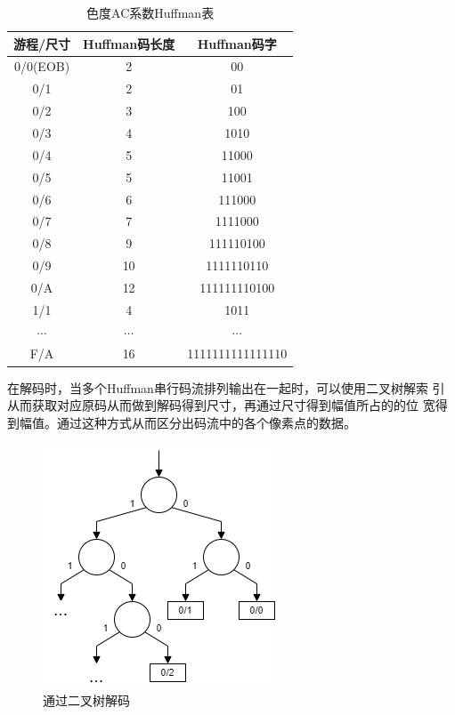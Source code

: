 \documentclass{article}
\numberwithin {equation}{section}
\begin{document}
\begin{spacing}{1.25}
      \begin{table}[H]
        \centering
        \caption{色度AC系数Huffman表}
        \begin{tabular}{ccc}
          \toprule
          游程/尺寸 & Huffman码长度 & Huffman码字\\
          \midrule
          0/0(EOB)  & 2             & 00\\
          0/1       & 2             & 01\\
          0/2       & 3             & 100\\
          0/3       & 4             & 1010\\
          0/4       & 5             & 11000\\
          0/5       & 5             & 11001\\
          0/6       & 6             & 111000\\
          0/7       & 7             & 1111000\\
          0/8       & 9             & 111110100\\
          0/9       & 10            & 1111110110\\
          0/A       & 12            & 111111110100\\
          1/1       & 4             & 1011\\
          $\cdots$  & $\cdots$      & $\cdots$\\
          F/A       & 16            & 1111111111111110\\
          \bottomrule
        \end{tabular}
      \end{table}

      在解码时，当多个Huffman串行码流排列输出在一起时，可以使用二叉树解索
      引从而获取对应原码从而做到解码得到尺寸，再通过尺寸得到幅值所占的的位
      宽得到幅值。通过这种方式从而区分出码流中的各个像素点的数据。
      \begin{figure}[H]
        \centering
        \includegraphics[scale=0.8]{./pictures/deCodeTree.png}
        \caption{通过二叉树解码}
      \end{figure}

\end{spacing}
\end{document}
